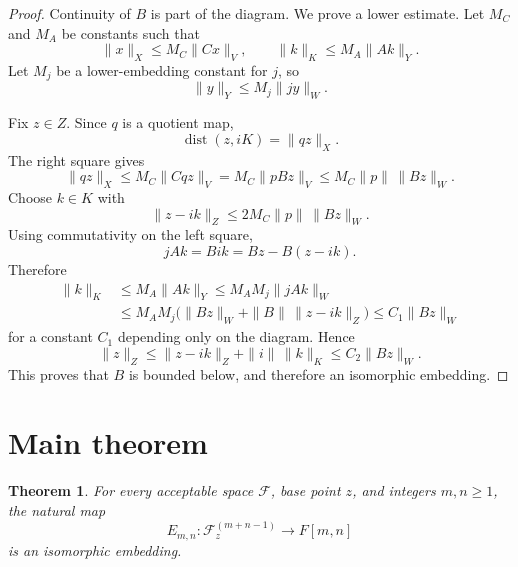 \documentclass[11pt]{article}
\newtheorem{theorem}{Theorem}
\newcommand{\F}{\mathscr F}
\newcommand{\To}{\longrightarrow}
\begin{document}
\begin{proof}
Continuity of \(B\) is part of the diagram.  We prove a lower estimate.
Let \(M_C\) and \(M_A\) be constants such that
\[
  \|x\|_X\le M_C\|Cx\|_V,\qquad
  \|k\|_K\le M_A\|Ak\|_Y .
\]
Let \(M_j\) be a lower-embedding constant for \(j\), so
\[
  \|y\|_Y\le M_j\|jy\|_W.
\]

Fix \(z\in Z\).  Since \(q\) is a quotient map,
\[
  \operatorname{dist}(z,iK)=\|qz\|_{X}.
\]
The right square gives
\[
  \|qz\|_X\le M_C\|Cqz\|_V
       =M_C\|pBz\|_V
       \le M_C\|p\|\,\|Bz\|_W .
\]
Choose \(k\in K\) with
\[
  \|z-i k\|_Z\le 2M_C\|p\|\,\|Bz\|_W .
\]
Using commutativity on the left square,
\[
  jAk=Bik=Bz-B(z-ik).
\]
Therefore
\[
\begin{aligned}
  \|k\|_K
  &\le M_A\|Ak\|_Y
   \le M_A M_j\|jAk\|_W  \\
  &\le M_A M_j\big(\|Bz\|_W+\|B\|\,\|z-ik\|_Z\big)
   \le C_1\|Bz\|_W
\end{aligned}
\]
for a constant \(C_1\) depending only on the diagram.  Hence
\[
  \|z\|_Z\le \|z-ik\|_Z+\|i\|\,\|k\|_K\le C_2\|Bz\|_W.
\]
This proves that \(B\) is bounded below, and therefore an isomorphic embedding.
\end{proof}

\section*{Main theorem}

\begin{theorem}\label{thm:emn}
For every acceptable space \(\F\), base point \(z\), and integers \(m,n\ge1\), the natural map
\[
  E_{m,n}:\F_z^{(m+n-1)}\To F[m,n]
\]
is an isomorphic embedding.
\end{theorem}
\end{document}
